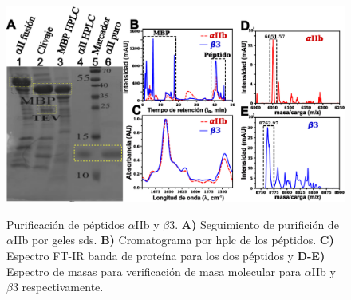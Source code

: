 \begin{figure}[H] %
    \centering
	\includegraphics[width=0.99\linewidth]{fig/01_expe/purifi/expres_hplc_masas.pdf}
	\caption[Purificación de péptidos $\alpha$IIb y $\beta$3.]{Purificación de péptidos $\alpha$IIb y $\beta$3. \textbf{A)} Seguimiento de purifición de $\alpha$IIb  por geles \ac{sds}. \textbf{B)} Cromatograma por \ac{hplc} de los péptidos. \textbf{C)} Espectro FT-IR banda de proteína para los dos péptidos y \textbf{D-E)} Espectro de masas para verificación de masa molecular para $\alpha$IIb y $\beta$3 respectivamente.}
    \label{fig:expr_hplc_masas}
\end{figure}





